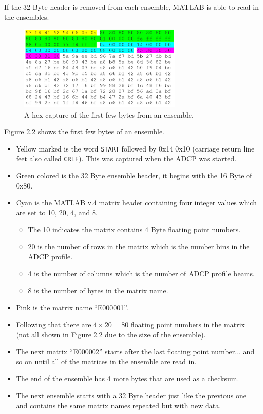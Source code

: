 If the 32 Byte header is removed from each ensemble, MATLAB is able to read in the ensembles.
\begin{figure}[h]
\centering
      \includegraphics[width=0.7\textwidth]{hexdump}
        \caption{A hex-capture of the first few bytes from an ensemble.}
\end{figure}
Figure 2.2 shows the first few bytes of an ensemble.
\begin{itemize}
\item Yellow marked is the word \texttt{START} followed by 0x14 0x10 (carriage return line feet also called \texttt{CRLF}). This was captured when the ADCP was started.
\item Green colored is the 32 Byte ensemble header, it begins with the 16 Byte of 0x80.
\item Cyan is the MATLAB v.4 matrix header containing four integer values which are set to 10, 20, 4, and 8.  
\begin{itemize}
\item The 10 indicates the matrix contains 4 Byte floating point numbers. 
\item 20 is the number of rows in the matrix which is the number bins in the ADCP profile. 
\item 4 is the number of columns which is the number of ADCP profile beams.  
\item 8 is the number of bytes in the matrix name.  
\end{itemize}
\item Pink is the matrix name ``E000001''.
\item Following that there are $4 \times 20 = 80$  floating point numbers in the matrix (not all shown in Figure 2.2 due to the size of the ensemble).
\item The next matrix ``E000002'' starts after the last floating point number... and so on until all of the matrices in the ensemble are read in.
\item The end of the ensemble has 4 more bytes that are used as a checksum. 
\item The next ensemble starts with a 32 Byte header just like the previous one and contains the same matrix names repeated but with new data. 
\end{itemize}

